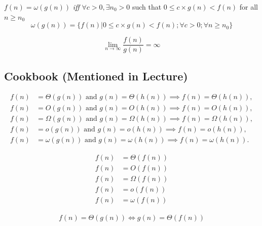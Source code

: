 \begin{theorem}
    $f(n) = \omega(g(n))$ \textit{iff} $\forall c > 0, \exists n_0 > 0$ such that $0 \leq c\times g(n) < f(n)$ for all $n \geq n_0$
    \[\omega(g(n)) = \{f(n) | 0 \leq c\times g(n) < f(n); \forall c > 0; \forall n \geq n_0 \}\]
\end{theorem}

\begin{corollary}
    [The relation between $g(n)$ and $f(n) = \omega(g(n))$]
    \[\lim_{n\to \infty}\frac{f(n)}{g(n)} = \infty\]
\end{corollary}

\subsection*{Cookbook (Mentioned in Lecture)}
\begin{definition}
    [Transitivity]
    \begin{align*}
        f(n) & = \Theta(g(n)) \text{ and } g(n) = \Theta(h(n)) \implies f(n) = \Theta(h(n)), \\
        f(n) & = O(g(n)) \text{ and } g(n) = O(h(n)) \implies f(n) = O(h(n)),                \\
        f(n) & = \Omega(g(n)) \text{ and } g(n) = \Omega(h(n)) \implies f(n) = \Omega(h(n)), \\
        f(n) & = o(g(n)) \text{ and } g(n) = o(h(n)) \implies f(n) = o(h(n)),                \\
        f(n) & = \omega(g(n)) \text{ and } g(n) = \omega(h(n)) \implies f(n) = \omega(h(n)).
    \end{align*}
\end{definition}

\begin{definition}
    [Reflexivity]
    \begin{align*}
        f(n) & = \Theta(f(n)) \\
        f(n) & = O(f(n))      \\
        f(n) & = \Omega(f(n)) \\
        f(n) & = o(f(n))      \\
        f(n) & = \omega(f(n))
    \end{align*}
\end{definition}

\begin{definition}
    [Symmetry]
    \begin{align*}
        f(n) = \Theta(g(n)) \iff g(n) = \Theta(f(n))
    \end{align*}
\end{definition}

